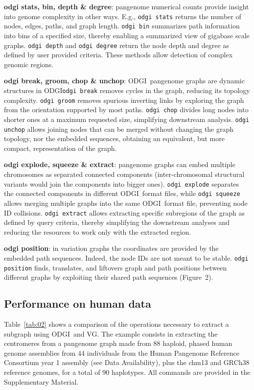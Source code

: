 \documentclass{bioinfo}
\newcommand{\odgi}{ODGI}
\newcommand{\cmd}[1]{{\texttt{#1}}}
\newcommand{\cmdbf}[1]{{\textbf{#1}}}
\newcommand{\topic}[1]{{\cmdbf{#1}}:}
\begin{document}
    \topic{odgi stats, bin, depth \& degree} pangenome numerical
    counts provide insight into genome complexity in other
    ways. E.g., \cmd{odgi stats} returns the number of nodes,
    edges, paths, and graph length. \cmd{odgi bin} summarizes path
    information into bins of a specified size, thereby enabling a
    summarized view of gigabase scale graphs. \cmd{odgi depth} and
    \cmd{odgi degree} return the node depth and degree as defined by
    user provided criteria. These methods allow detection of complex
    genomic regions.

    \topic{odgi break, groom, chop \& unchop} \odgi\ pangenome graphs are dynamic structures in \odgi\.
    \cmd{odgi break} removes cycles in the graph, reducing its topology complexity. \cmd{odgi groom}
    removes spurious inverting links by exploring the graph from the orientation supported by most paths. \cmd{odgi chop}
    divides long nodes into shorter ones at a maximum requested size, simplifying downstream analysis.
    \cmd{odgi unchop} allows joining nodes that can be merged without changing the graph topology, nor the
    embedded sequences, obtaining an equivalent, but more compact, representation of the graph.

    \topic{odgi explode, squeeze \& extract} pangenome graphs can embed multiple chromosomes as separated connected
    components (inter-chromosomal structural variants would join the components into bigger ones).
    \cmd{odgi explode} separates the connected components in different \odgi\ format files, while \cmd{odgi squeeze}
    allows merging multiple graphs into the same \odgi\ format file, preventing node ID collisions. \cmd{odgi extract}
    allows extracting specific subregions of the graph as defined by query criteria, thereby simplifying the downstream
    analyses and reducing the resources to work only with the extracted region.

    \topic{odgi position} in variation graphs the coordinates are provided by the embedded path sequences. Indeed, the node
    IDs are not meant to be stable. \cmd{odgi position} finds, translates, and liftovers graph and path positions between
    different graphs by exploiting their shared path sequences (Figure~2\vphantom{\ref{fig:2}}).

    \subsection{Performance on human data}

    Table~\ref{tab:02} shows a comparison of the operations necessary to extract a subgraph using \odgi\ and VG. The
    example consists in extracting the centromeres from a pangenome graph made from 88 haploid, phased human genome
    assemblies from 44 individuals from the Human Pangenome Reference Consortium year 1 assembly (see Data
    Availability), plus the chm13 and GRCh38 reference genomes, for a total of 90 haplotypes. All commands are provided
    in the Supplementary Material.
\end{document}

